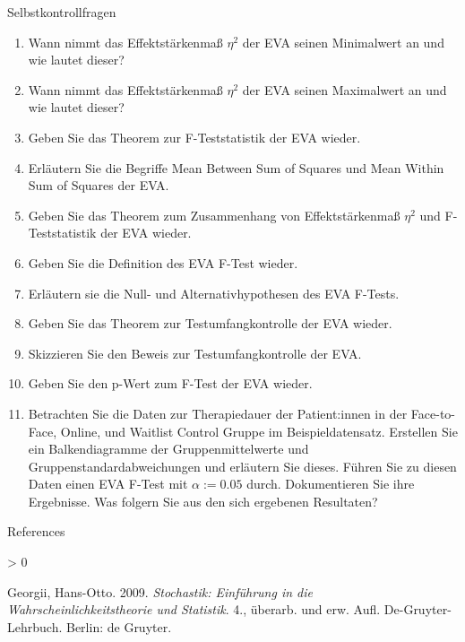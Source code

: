 \documentclass[
  8pt,
  ignorenonframetext,
]{beamer}
\newlength{\cslhangindent}
\newenvironment{CSLReferences}[2] %
 {%
  \setlength{\parindent}{0pt}
  \ifodd #1 \everypar{\setlength{\hangindent}{\cslhangindent}}\ignorespaces\fi
  \ifnum #2 > 0
  \setlength{\parskip}{#2\baselineskip}
  \fi
 }%
 {}
\begin{document}
\begin{frame}{Selbstkontrollfragen}
\protect\hypertarget{selbstkontrollfragen-1}{}
\footnotesize
\begin{enumerate}
\itemsep1mm
\setcounter{enumi}{14}
\justifying
\item Wann nimmt das Effektstärkenmaß $\eta^2$ der EVA seinen Minimalwert an und wie lautet dieser?
\item Wann nimmt das Effektstärkenmaß $\eta^2$ der EVA seinen Maximalwert an und wie lautet dieser?
\item Geben Sie das Theorem zur F-Teststatistik der EVA wieder.
\item Erläutern Sie die Begriffe Mean Between Sum of Squares und Mean Within Sum of Squares der EVA.
\item Geben Sie das Theorem zum Zusammenhang von Effektstärkenmaß $\eta^2$  und F-Teststatistik der EVA wieder.
\item Geben Sie die Definition des EVA F-Test wieder.
\item Erläutern sie die Null- und Alternativhypothesen des EVA F-Tests.
\item Geben Sie das Theorem zur Testumfangkontrolle der EVA wieder.
\item Skizzieren Sie den Beweis zur Testumfangkontrolle der EVA.
\item Geben Sie den p-Wert zum F-Test der EVA wieder.
\item Betrachten Sie die Daten zur Therapiedauer der Patient:innen in der Face-to-Face,
Online, und Waitlist Control Gruppe im Beispieldatensatz. Erstellen Sie ein Balkendiagramme 
der Gruppenmittelwerte und Gruppenstandardabweichungen und erläutern Sie dieses. 
Führen Sie zu diesen Daten einen EVA F-Test mit $\alpha := 0.05$ durch. 
Dokumentieren Sie ihre Ergebnisse. Was folgern Sie aus den sich ergebenen Resultaten?
\end{enumerate}
\end{frame}

\begin{frame}{References}
\protect\hypertarget{references}{}
\footnotesize

\hypertarget{refs}{}
\begin{CSLReferences}{1}{0}
\leavevmode\hypertarget{ref-georgii_2009}{}%
Georgii, Hans-Otto. 2009. \emph{{Stochastik: Einführung in die
Wahrscheinlichkeitstheorie und Statistik}}. 4., überarb. und erw. Aufl.
{De-Gruyter-Lehrbuch}. {Berlin}: {de Gruyter}.

\end{CSLReferences}
\end{frame}
\end{document}
